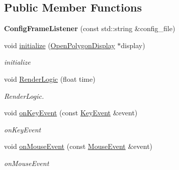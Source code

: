 \subsection*{Public Member Functions}
\begin{DoxyCompactItemize}
\item 
\hypertarget{classEngine_1_1ConfigFrameListener_a71f1b03339aeb75dfd45fcc4ca11f92f}{}{\bfseries Config\+Frame\+Listener} (const std\+::string \&config\+\_\+file)\label{classEngine_1_1ConfigFrameListener_a71f1b03339aeb75dfd45fcc4ca11f92f}

\item 
void \hyperlink{classEngine_1_1ConfigFrameListener_a792fe9af553206a358bc888fdc43f2be}{initialize} (\hyperlink{classEngine_1_1OpenPolygonDisplay}{Open\+Polygon\+Display} $\ast$display)
\begin{DoxyCompactList}\small\item\em initialize \end{DoxyCompactList}\item 
void \hyperlink{classEngine_1_1ConfigFrameListener_addb569607e5f870efda08a1a7de41544}{Render\+Logic} (float time)
\begin{DoxyCompactList}\small\item\em Render\+Logic. \end{DoxyCompactList}\item 
void \hyperlink{classEngine_1_1ConfigFrameListener_a2e412a7541868de93953c7cd818a6968}{on\+Key\+Event} (const \hyperlink{classEngine_1_1KeyEvent}{Key\+Event} \&event)
\begin{DoxyCompactList}\small\item\em on\+Key\+Event \end{DoxyCompactList}\item 
void \hyperlink{classEngine_1_1ConfigFrameListener_ac293a2b4c841a19e39d5e3d74eeb6ec3}{on\+Mouse\+Event} (const \hyperlink{classEngine_1_1MouseEvent}{Mouse\+Event} \&event)
\begin{DoxyCompactList}\small\item\em on\+Mouse\+Event \end{DoxyCompactList}\end{DoxyCompactItemize}
